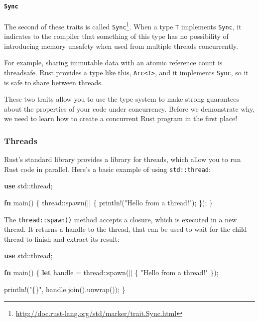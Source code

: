 \documentclass[a4paper,]{book}
\newenvironment{Shaded}{\begin{snugshade}}{\end{snugshade}}
\newcommand{\KeywordTok}[1]{\textcolor[rgb]{0.13,0.29,0.53}{\textbf{{#1}}}}
\newcommand{\StringTok}[1]{\textcolor[rgb]{0.31,0.60,0.02}{{#1}}}
\newcommand{\OtherTok}[1]{\textcolor[rgb]{0.56,0.35,0.01}{{#1}}}
\newcommand{\NormalTok}[1]{{#1}}
\renewcommand{\href}[2]{#2\footnote{\url{#1}}}
\begin{document}
\paragraph{\texorpdfstring{\texttt{Sync}}{Sync}}\label{sync}

The second of these traits is called
\href{http://doc.rust-lang.org/std/marker/trait.Sync.html}{\texttt{Sync}}.
When a type \texttt{T} implements \texttt{Sync}, it indicates to the
compiler that something of this type has no possibility of introducing
memory unsafety when used from multiple threads concurrently.

For example, sharing immutable data with an atomic reference count is
threadsafe. Rust provides a type like this,
\texttt{Arc\textless{}T\textgreater{}}, and it implements \texttt{Sync},
so it is safe to share between threads.

These two traits allow you to use the type system to make strong
guarantees about the properties of your code under concurrency. Before
we demonstrate why, we need to learn how to create a concurrent Rust
program in the first place!

\subsubsection{Threads}\label{threads}

Rust's standard library provides a library for threads, which allow you
to run Rust code in parallel. Here's a basic example of using
\texttt{std::thread}:

\begin{Shaded}
\begin{Highlighting}[]
\KeywordTok{use} \NormalTok{std::thread;}

\KeywordTok{fn} \NormalTok{main() \{}
    \NormalTok{thread::spawn(|| \{}
        \OtherTok{println!}\NormalTok{(}\StringTok{"Hello from a thread!"}\NormalTok{);}
    \NormalTok{\});}
\NormalTok{\}}
\end{Highlighting}
\end{Shaded}

The \texttt{thread::spawn()} method accepts a closure, which is executed
in a new thread. It returns a handle to the thread, that can be used to
wait for the child thread to finish and extract its result:

\begin{Shaded}
\begin{Highlighting}[]
\KeywordTok{use} \NormalTok{std::thread;}

\KeywordTok{fn} \NormalTok{main() \{}
    \KeywordTok{let} \NormalTok{handle = thread::spawn(|| \{}
        \StringTok{"Hello from a thread!"}
    \NormalTok{\});}

    \OtherTok{println!}\NormalTok{(}\StringTok{"\{\}"}\NormalTok{, handle.join().unwrap());}
\NormalTok{\}}
\end{Highlighting}
\end{Shaded}
\end{document}
